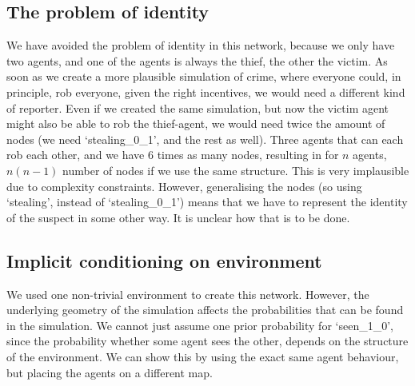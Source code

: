 \subsection{The problem of identity}
We have avoided the problem of identity in this network, because we only have two agents, and one of the agents is always the thief, the other the victim. As soon as we create a more plausible simulation of crime, where everyone could, in principle, rob everyone, given the right incentives, we would need a different kind of reporter. Even if we created the same simulation, but now the victim agent might also be able to rob the thief-agent, we would need twice the amount of nodes (we need `stealing\_0\_1', and the rest as well). Three agents that can each rob each other, and we have 6 times as many nodes, resulting in for $n$ agents, $n(n-1)$ number of nodes if we use the same structure. This is very implausible due to complexity constraints. However, generalising the nodes (so using `stealing', instead of `stealing\_0\_1') means that we have to represent the identity of the suspect in some other way. It is unclear how that is to be done.


\subsection{Implicit conditioning on environment}

We used one non-trivial environment to create this network. However, the underlying geometry of the simulation affects the probabilities that can be found in the simulation. We cannot just assume one prior probability for `seen\_1\_0', since the probability whether some agent sees the other, depends on the structure of the environment. We can show this by using the exact same agent behaviour, but placing the agents on a different map.

